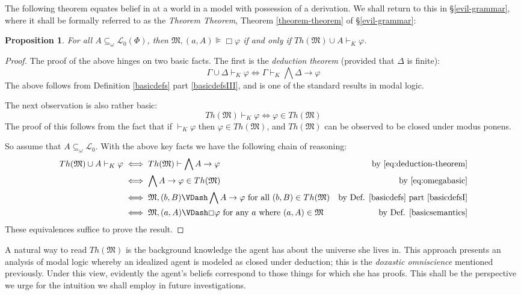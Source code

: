 \documentclass[11pt,titlepage]{report}
\numberwithin{equation}{subsection}
\newtheorem{prop}[theorem]{Proposition}
\renewcommand{\Omega}{\mathfrak{M}}
\renewcommand{\phi}{\varphi}
\begin{document}
The following theorem equates belief in at a world in a model with
possession of a derivation.  We shall return to this in
\S\ref{evil-grammar}, where it shall be formally referred to as the
\emph{Theorem Theorem}, Theorem \ref{theorem-theorem} of \S\ref{evil-grammar}:
\begin{prop}\label{central-prop}
 For all $A\subseteq_\omega \mathcal{L}_0(\Phi)$, then $\Omega, (a,A) \VDash \Box \phi$ if and only if $Th(\Omega) \cup A \vdash_K \phi$.
\end{prop}
\begin{proof}
The proof of the above hinges on two basic facts.  The first is the
\emph{deduction theorem} (provided that $\Delta$ is finite):
\begin{equation}
\Gamma \cup \Delta \vdash_K \phi \iff \Gamma \vdash_K \bigwedge \Delta \to \phi \label{eq:deduction-theorem}
\end{equation}
The above follows from Definition
\ref{basicdefs} part \ref{basicdefsIII}, and is one of the standard results in
modal logic.

The next observation is also rather basic:
\begin{equation}
Th(\Omega) \vdash_K \phi \iff \phi \in Th(\Omega) \label{eq:omegabasic}
\end{equation}
The proof of this follows from the fact that if $\vdash_K \phi$ then
$\phi \in Th(\Omega)$, and $Th(\Omega)$ can be observed to be  closed under modus ponens.

So assume that $A \subseteq_\omega
\mathcal{L}_0$. With the above key facts we have the following chain
of reasoning:
\begin{align*}
  Th(\Omega) \cup A \vdash_K \phi & \iff   Th(\Omega) \vdash \bigwedge A
  \to \phi 
   & \textup{by \eqref{eq:deduction-theorem}} 
\\
 & \iff \bigwedge A \to \phi \in Th(\Omega) & \textup{by
   \eqref{eq:omegabasic}} \\
 & \iff \Omega, (b,B) \VDash \bigwedge A \to \phi \textup{ for all
   $(b,B) \in Th(\Omega)$} & \textup{by Def. \ref{basicdefs} part
   \ref{basicdefsI}} \\
 & \iff \Omega,(a,A) \VDash \Box \phi \textup{ for any $a$ where
   $(a,A) \in \Omega$} & \textup{by Def. \ref{basicsemantics}}
\end{align*}
These equivalences suffice to prove the result.
\end{proof}

A natural way to read $Th(\Omega)$ is the background knowledge the
agent has about the universe she lives in.  This approach presents an
analysis of modal logic whereby an idealized agent is modeled as
closed under deduction; this is the \emph{doxastic omniscience}
mentioned previously. Under this view, evidently the agent's beliefs
correspond to those things for which she has proofs.  This shall be
the perspective we urge for the intuition we shall employ in future 
investigations.
\end{document}
